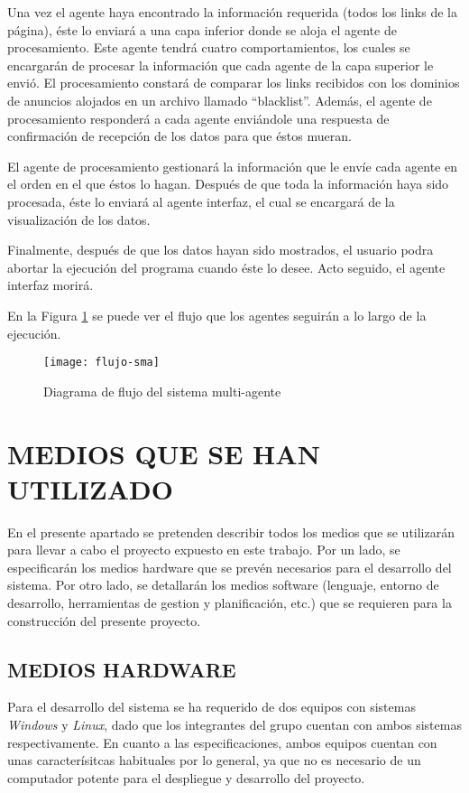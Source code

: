 \documentclass{pre-tfg}
\begin{document}
Una vez el agente haya encontrado la información requerida (todos los links de la página), éste lo enviará a una capa inferior donde se aloja el agente de procesamiento. Este agente tendrá cuatro comportamientos, los cuales se encargarán de procesar la información que cada agente de la capa superior le envió. El procesamiento constará de comparar los links recibidos con los dominios de anuncios alojados en un archivo llamado ``blacklist''. Además, el agente de procesamiento responderá a cada agente enviándole una respuesta de confirmación de recepción de los datos para que éstos mueran.

El agente de procesamiento gestionará la información que le envíe cada agente en el orden en el que éstos lo hagan. Después de que toda la información haya sido procesada, éste lo enviará al agente interfaz, el cual se encargará de la visualización de los datos.

Finalmente, después de que los datos hayan sido mostrados, el usuario podra abortar la ejecución del programa cuando éste lo desee. Acto seguido, el agente interfaz morirá.

En la Figura \ref{fig:flujo-sma} se puede ver el flujo que los agentes seguirán a lo largo de la ejecución.

\begin{figure}[h]
    \centering
    \texttt{[image: flujo-sma]}
    \caption{Diagrama de flujo del sistema multi-agente}
    \label{fig:flujo-sma}
\end{figure}

\clearpage

\section{MEDIOS QUE SE HAN UTILIZADO}
En el presente apartado se pretenden describir todos los medios que se utilizarán para llevar a cabo el proyecto
expuesto en este trabajo. Por un lado, se especificarán los medios hardware que se prevén necesarios para el desarrollo
del sistema. Por otro lado, se detallarán los medios software (lenguaje, entorno de desarrollo, herramientas de gestion y 
planificación, etc.) que se requieren para la construcción del presente proyecto.

\subsection{MEDIOS HARDWARE}
Para el desarrollo del sistema se ha requerido de dos equipos con sistemas \textit{Windows} y \textit{Linux}, dado
que los integrantes del grupo cuentan con ambos sistemas respectivamente. En cuanto a las especificaciones, ambos equipos
cuentan con unas caracterísitcas habituales por lo general, ya que no es necesario de un computador potente para el despliegue y desarrollo del
proyecto.
\end{document}
